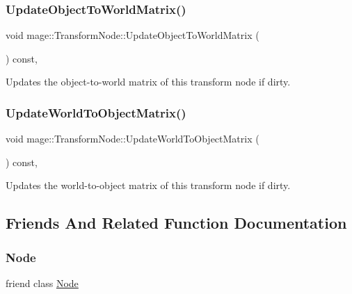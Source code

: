 \subsubsection{\texorpdfstring{Update\+Object\+To\+World\+Matrix()}{UpdateObjectToWorldMatrix()}}
{\footnotesize\ttfamily void mage\+::\+Transform\+Node\+::\+Update\+Object\+To\+World\+Matrix (\begin{DoxyParamCaption}{ }\end{DoxyParamCaption}) const\hspace{0.3cm}{\ttfamily [private]}, {\ttfamily [noexcept]}}

Updates the object-\/to-\/world matrix of this transform node if dirty. \hypertarget{structmage_1_1_transform_node_aec6309962398c128fdf3f50cbff13e89}{}\label{structmage_1_1_transform_node_aec6309962398c128fdf3f50cbff13e89} 
\subsubsection{\texorpdfstring{Update\+World\+To\+Object\+Matrix()}{UpdateWorldToObjectMatrix()}}
{\footnotesize\ttfamily void mage\+::\+Transform\+Node\+::\+Update\+World\+To\+Object\+Matrix (\begin{DoxyParamCaption}{ }\end{DoxyParamCaption}) const\hspace{0.3cm}{\ttfamily [private]}, {\ttfamily [noexcept]}}

Updates the world-\/to-\/object matrix of this transform node if dirty. 

\subsection{Friends And Related Function Documentation}
\hypertarget{structmage_1_1_transform_node_a6db9d28bd448a131448276ee03de1e6d}{}\label{structmage_1_1_transform_node_a6db9d28bd448a131448276ee03de1e6d} 
\subsubsection{\texorpdfstring{Node}{Node}}
{\footnotesize\ttfamily friend class \hyperlink{classmage_1_1_node}{Node}\hspace{0.3cm}{\ttfamily [friend]}}



